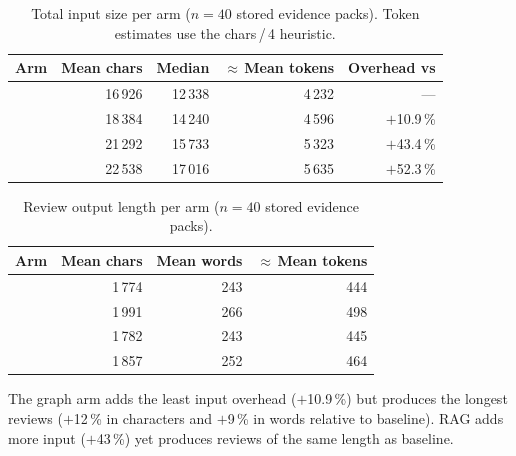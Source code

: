 \begin{table}[htbp]
    \centering
    \caption{Total input size per arm ($n = 40$ stored evidence packs).
             Token estimates use the chars\,/\,4 heuristic.}
    \label{tab:prompt-length}
    \small
    \begin{tabular}{lrrrr}
        \toprule
        Arm & Mean chars & Median & $\approx$\,Mean tokens & Overhead vs \baseline{} \\
        \midrule
        \baseline{} & 16\,926 & 12\,338 & 4\,232 & --- \\
        \kg{}       & 18\,384 & 14\,240 & 4\,596 & $+$10.9\,\% \\
        \rag{}      & 21\,292 & 15\,733 & 5\,323 & $+$43.4\,\% \\
        \hybrid{}   & 22\,538 & 17\,016 & 5\,635 & $+$52.3\,\% \\
        \bottomrule
    \end{tabular}
\end{table}

\begin{table}[htbp]
    \centering
    \caption{Review output length per arm ($n = 40$ stored evidence packs).}
    \label{tab:review-length}
    \small
    \begin{tabular}{lrrr}
        \toprule
        Arm & Mean chars & Mean words & $\approx$\,Mean tokens \\
        \midrule
        \baseline{} & 1\,774 & 243 & 444 \\
        \kg{}       & 1\,991 & 266 & 498 \\
        \rag{}      & 1\,782 & 243 & 445 \\
        \hybrid{}   & 1\,857 & 252 & 464 \\
        \bottomrule
    \end{tabular}
\end{table}

The graph arm adds the least input overhead ($+$10.9\,\%) but produces
the longest reviews ($+$12\,\% in characters and $+$9\,\% in words relative
to baseline). RAG
adds more input ($+$43\,\%) yet produces reviews of the same length as
baseline.

